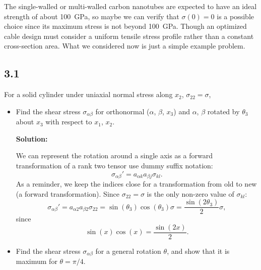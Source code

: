 \documentclass[12pt]{article}
\begin{document}
The single-walled or multi-walled carbon nanotubes are expected to have an ideal strength of about
\SI{100}{\giga\pascal},\cite{pugno2006strength}
so maybe we can verify that $\sigma(0) = 0$ is a possible choice since its maximum stress is not beyond \SI{100}{\giga\pascal}.
Though an optimized cable design must consider a uniform tensile stress profile rather than a constant
cross-section area.\cite{pugno2006strength} What we considered now is just a simple example problem.

\subsection{3.1}
For a solid cylinder under uniaxial normal stress along $x_2$, $\sigma_{22} = \sigma$,
\begin{itemize}
	\item Find the shear stress $\sigma_{\alpha\beta}$ for orthonormal ($\alpha$, $\beta$, $x_3$)
	      and $\alpha$, $\beta$ rotated by $\theta_3$ about $x_3$ with respect to $x_1$, $x_2$.

	      \textbf{Solution:}

	      We can represent the rotation around a single axis as a forward transformation of a rank two tensor use
	      dummy suffix notation:
	      \begin{equation}
		      \sigma_{\alpha\beta}' = a_{\alpha k} a_{\beta j} \sigma_{kl}.
	      \end{equation}
	      As a reminder, we keep the indices close for a transformation from old to new (a forward transformation).
	      Since $\sigma_{22} = \sigma$ is the only non-zero value of $\sigma_{kl}$:
	      \begin{equation}
		      \sigma_{\alpha\beta}' = a_{\alpha 2} a_{\beta 2} \sigma_{22} = \sin(\theta_3) \cos(\theta_3) \sigma = \frac{\sin(2\theta_3)}{2} \sigma,
	      \end{equation}
	      since
	      \begin{equation}
		      \sin(x) \cos(x) = \frac{\sin(2x)}{2}.
	      \end{equation}
	\item Find the shear stress $\sigma_{\alpha\beta}$ for a general rotation $\theta$,
	      and show that it is maximum for $\theta = \pi/4$.


\end{itemize}
\end{document}
